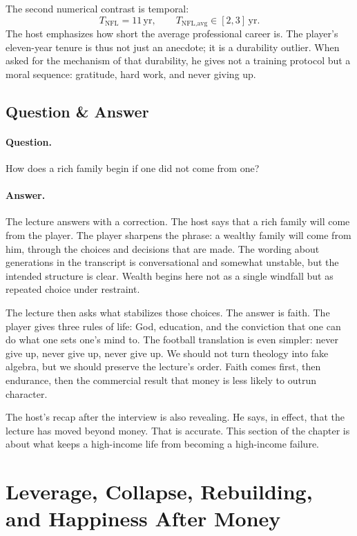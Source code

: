 The second numerical contrast is temporal:
\begin{equation}
T_{\text{NFL}}=11\,\mathrm{yr},\qquad
T_{\text{NFL,avg}}\in[2,3]\,\mathrm{yr}.
\end{equation}
The host emphasizes how short the average professional career is. The player's eleven-year tenure is thus not just an anecdote; it is a durability outlier. When asked for the mechanism of that durability, he gives not a training protocol but a moral sequence: gratitude, hard work, and never giving up.

\subsection{Question \& Answer}

\paragraph{Question.} How does a rich family begin if one did not come from one?

\paragraph{Answer.} The lecture answers with a correction. The host says that a rich family will come from the player. The player sharpens the phrase: a wealthy family will come from him, through the choices and decisions that are made. The wording about generations in the transcript is conversational and somewhat unstable, but the intended structure is clear. Wealth begins here not as a single windfall but as repeated choice under restraint.

The lecture then asks what stabilizes those choices. The answer is faith. The player gives three rules of life: God, education, and the conviction that one can do what one sets one's mind to. The football translation is even simpler: never give up, never give up, never give up. We should not turn theology into fake algebra, but we should preserve the lecture's order. Faith comes first, then endurance, then the commercial result that money is less likely to outrun character.

The host's recap after the interview is also revealing. He says, in effect, that the lecture has moved beyond money. That is accurate. This section of the chapter is about what keeps a high-income life from becoming a high-income failure.

\section{Leverage, Collapse, Rebuilding, and Happiness After Money}

